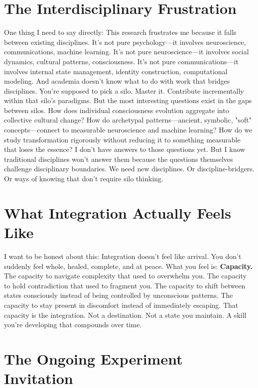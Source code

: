 \documentclass[12pt,openany]{book}
\begin{document}
\section{The Interdisciplinary Frustration}

One thing I need to say directly:
This research frustrates me because it falls between existing disciplines.
It's not pure psychology—it involves neuroscience, communications, machine learning.
It's not pure neuroscience—it involves social dynamics, cultural patterns, consciousness.
It's not pure communications—it involves internal state management, identity construction, computational modeling.
And academia doesn't know what to do with work that bridges disciplines.
You're supposed to pick a silo. Master it. Contribute incrementally within that silo's paradigms.
But the most interesting questions exist in the gaps between silos.
How does individual consciousness evolution aggregate into collective cultural change?
How do archetypal patterns—ancient, symbolic, "soft" concepts—connect to measurable neuroscience and machine learning?
How do we study transformation rigorously without reducing it to something measurable that loses the essence?
I don't have answers to those questions yet.
But I know traditional disciplines won't answer them because the questions themselves challenge disciplinary boundaries.
We need new disciplines. Or discipline-bridgers. Or ways of knowing that don't require silo thinking.

\section{What Integration Actually Feels Like}

I want to be honest about this:
Integration doesn't feel like arrival.
You don't suddenly feel whole, healed, complete, and at peace.
What you feel is: \textbf{Capacity.}
The capacity to navigate complexity that used to overwhelm you.
The capacity to hold contradiction that used to fragment you.
The capacity to shift between states consciously instead of being controlled by unconscious patterns.
The capacity to stay present in discomfort instead of immediately escaping.
That capacity is the integration.
Not a destination. Not a state you maintain. A skill you're developing that compounds over time.

\section{The Ongoing Experiment Invitation}
\end{document}
